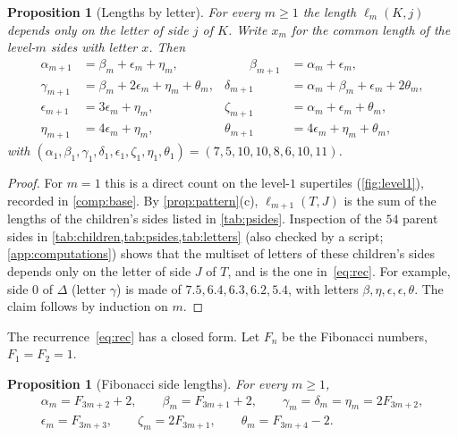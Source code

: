 \documentclass[11pt]{amsart}
\newtheorem{proposition}[theorem]{Proposition}
\theoremstyle{definition}
\theoremstyle{remark}
\newcommand{\Fib}{F}
\begin{document}
\begin{proposition}[Lengths by letter]\label{prop:letters}
For every $m\ge1$ the length $\ell_m(K,j)$ depends only on the letter of side $j$ of $K$. Write $x_m$ for the common
length of the level-$m$ sides with letter $x$. Then
\begin{equation}\label{eq:rec}
\begin{aligned}
\alpha_{m+1}&=\beta_m+\epsilon_m+\eta_m, &\qquad \beta_{m+1}&=\alpha_m+\epsilon_m,\\
\gamma_{m+1}&=\beta_m+2\epsilon_m+\eta_m+\theta_m, & \delta_{m+1}&=\alpha_m+\beta_m+\epsilon_m+2\theta_m,\\
\epsilon_{m+1}&=3\epsilon_m+\eta_m, & \zeta_{m+1}&=\alpha_m+\epsilon_m+\theta_m,\\
\eta_{m+1}&=4\epsilon_m+\eta_m, & \theta_{m+1}&=4\epsilon_m+\eta_m+\theta_m,
\end{aligned}
\end{equation}
with $(\alpha_1,\beta_1,\gamma_1,\delta_1,\epsilon_1,\zeta_1,\eta_1,\theta_1)=(7,5,10,10,8,6,10,11)$.
\end{proposition}

\begin{proof}
For $m=1$ this is a direct count on the level-$1$ supertiles (\cref{fig:level1}), recorded in \cref{comp:base}. By
\cref{prop:pattern}(c), $\ell_{m+1}(T,J)$ is the sum of the lengths of the children's sides listed in
\cref{tab:psides}. Inspection of the $54$ parent sides in \cref{tab:children,tab:psides,tab:letters} (also checked by a
script; \cref{app:computations}) shows that the multiset of letters of these children's sides depends only on the
letter of side $J$ of $T$, and is the one in~\eqref{eq:rec}. For example, side $0$ of
$\Delta$ (letter $\gamma$) is made of $7.5,6.4,6.3,6.2,5.4$, with letters $\beta,\eta,\epsilon,\epsilon,\theta$. The
claim follows by induction on $m$.
\end{proof}

The recurrence~\eqref{eq:rec} has a closed form. Let $\Fib_n$ be the Fibonacci numbers, $\Fib_1=\Fib_2=1$.

\begin{proposition}[Fibonacci side lengths]\label{prop:fib}
For every $m\ge1$,
\begin{gather*}
\alpha_m=\Fib_{3m+2}+2,\qquad \beta_m=\Fib_{3m+1}+2,\qquad \gamma_m=\delta_m=\eta_m=2\Fib_{3m+2},\\
\epsilon_m=\Fib_{3m+3},\qquad \zeta_m=2\Fib_{3m+1},\qquad \theta_m=\Fib_{3m+4}-2 .
\end{gather*}
\end{proposition}
\end{document}
